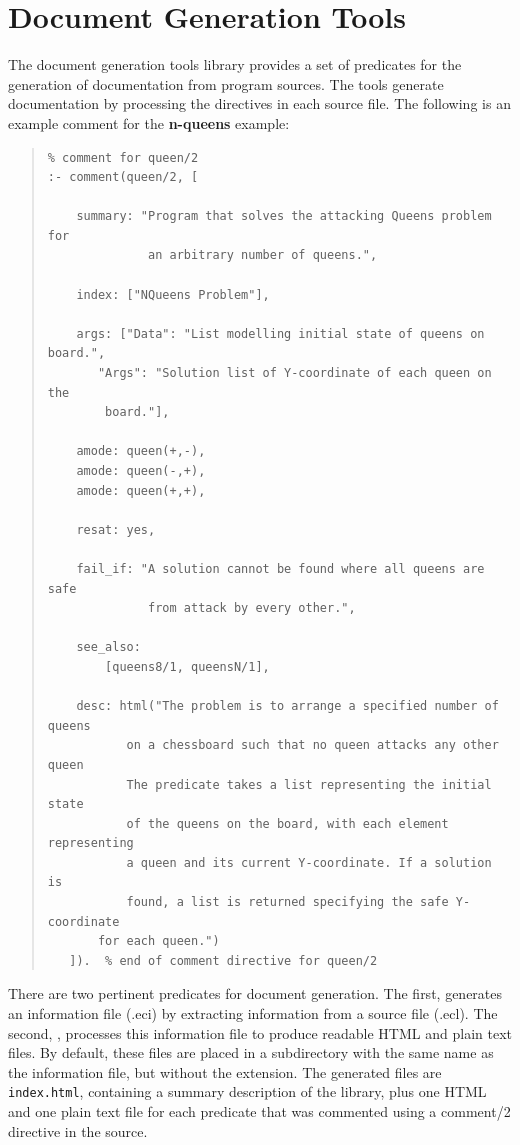 \section{Document Generation Tools}

The document generation tools library provides a set of predicates for 
the generation of documentation from \eclipse{} program sources. The 
tools generate documentation by processing the
directives in each source file. The following is an example comment for 
the \textbf{n-queens} example:

\begin{quote}
\begin{verbatim}
% comment for queen/2
:- comment(queen/2, [
 
    summary: "Program that solves the attacking Queens problem for
              an arbitrary number of queens.",
 
    index: ["NQueens Problem"],
 
    args: ["Data": "List modelling initial state of queens on board.",
       "Args": "Solution list of Y-coordinate of each queen on the 
        board."],
 
    amode: queen(+,-),
    amode: queen(-,+),
    amode: queen(+,+),
 
    resat: yes,
 
    fail_if: "A solution cannot be found where all queens are safe
              from attack by every other.",
 
    see_also:
        [queens8/1, queensN/1],
 
    desc: html("The problem is to arrange a specified number of queens
           on a chessboard such that no queen attacks any other queen
           The predicate takes a list representing the initial state
           of the queens on the board, with each element representing
           a queen and its current Y-coordinate. If a solution is 
           found, a list is returned specifying the safe Y-coordinate 
	   for each queen.")
   ]).  % end of comment directive for queen/2
\end{verbatim}
\end{quote}

There are two pertinent predicates for document generation. The first, 
 generates an 
information file (.eci) by extracting information from a source file (.ecl).
The second,
, 
processes this information file to produce readable HTML and plain text files.
By default, these files are placed in a subdirectory with the 
same name as the information file, but without the extension. 
The generated files are {\tt index.html}, containing a summary 
description of the library, plus one HTML and one plain text file 
for each predicate that was commented using a comment/2 directive 
in the source.


